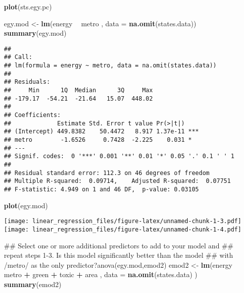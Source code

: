 \documentclass[]{article}
\newenvironment{Shaded}{\begin{snugshade}}{\end{snugshade}}
\newcommand{\KeywordTok}[1]{\textcolor[rgb]{0.13,0.29,0.53}{\textbf{#1}}}
\newcommand{\DataTypeTok}[1]{\textcolor[rgb]{0.13,0.29,0.53}{#1}}
\newcommand{\StringTok}[1]{\textcolor[rgb]{0.31,0.60,0.02}{#1}}
\newcommand{\OperatorTok}[1]{\textcolor[rgb]{0.81,0.36,0.00}{\textbf{#1}}}
\newcommand{\NormalTok}[1]{#1}
\begin{document}
\begin{Shaded}
\begin{Highlighting}[]
\KeywordTok{plot}\NormalTok{(sts.egy.pc)}

\NormalTok{egy.mod <-}\StringTok{ }\KeywordTok{lm}\NormalTok{(energy }\OperatorTok{~}\StringTok{ }\NormalTok{metro , }\DataTypeTok{data =} \KeywordTok{na.omit}\NormalTok{(states.data))}
\KeywordTok{summary}\NormalTok{(egy.mod)}
\end{Highlighting}
\end{Shaded}

\begin{verbatim}
## 
## Call:
## lm(formula = energy ~ metro, data = na.omit(states.data))
## 
## Residuals:
##     Min      1Q  Median      3Q     Max 
## -179.17  -54.21  -21.64   15.07  448.02 
## 
## Coefficients:
##             Estimate Std. Error t value Pr(>|t|)    
## (Intercept) 449.8382    50.4472   8.917 1.37e-11 ***
## metro        -1.6526     0.7428  -2.225    0.031 *  
## ---
## Signif. codes:  0 '***' 0.001 '**' 0.01 '*' 0.05 '.' 0.1 ' ' 1
## 
## Residual standard error: 112.3 on 46 degrees of freedom
## Multiple R-squared:  0.09714,    Adjusted R-squared:  0.07751 
## F-statistic: 4.949 on 1 and 46 DF,  p-value: 0.03105
\end{verbatim}

\begin{Shaded}
\begin{Highlighting}[]
\KeywordTok{plot}\NormalTok{(egy.mod)}
\end{Highlighting}
\end{Shaded}

\texttt{[image: linear\_regression\_files/figure-latex/unnamed-chunk-1-3.pdf]}
\texttt{[image: linear\_regression\_files/figure-latex/unnamed-chunk-1-4.pdf]}

\begin{Shaded}
\begin{Highlighting}[]
\NormalTok{##   Select one or more additional predictors to add to your model and}
\NormalTok{##   repeat steps 1-3. Is this model significantly better than the model}
\NormalTok{##   with /metro/ as the only predictor?anova(egy.mod,emod2)}
\NormalTok{emod2  <-}\StringTok{  }\KeywordTok{lm}\NormalTok{(energy }\OperatorTok{~}\StringTok{ }\NormalTok{metro }\OperatorTok{+}\StringTok{  }\NormalTok{green }\OperatorTok{+}\StringTok{ }\NormalTok{toxic }\OperatorTok{+}\StringTok{ }\NormalTok{area , }\DataTypeTok{data =} \KeywordTok{na.omit}\NormalTok{(states.data) )}
\KeywordTok{summary}\NormalTok{(emod2)}
\end{Highlighting}
\end{Shaded}
\end{document}
